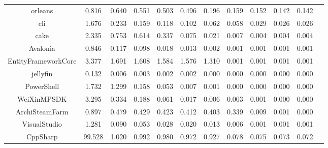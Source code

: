 \begin{table}[!h]
{\begin{tabular}{|c|cccccccccc|c|}
orleans	&	0.816	&	0.640	&	0.551	&	0.503	&	0.496	&	0.196	&	0.159	&	0.152	&	0.142	&	0.142	\\
cli	&	1.676	&	0.233	&	0.159	&	0.118	&	0.102	&	0.062	&	0.058	&	0.029	&	0.026	&	0.026	\\
cake	&	2.335	&	0.753	&	0.614	&	0.337	&	0.075	&	0.021	&	0.007	&	0.004	&	0.004	&	0.004	\\
Avalonia	&	0.846	&	0.117	&	0.098	&	0.018	&	0.013	&	0.002	&	0.001	&	0.001	&	0.001	&	0.001	\\
EntityFrameworkCore	&	3.377	&	1.691	&	1.608	&	1.584	&	1.576	&	1.310	&	0.001	&	0.001	&	0.001	&	0.001	\\
jellyfin	&	0.132	&	0.006	&	0.003	&	0.002	&	0.002	&	0.000	&	0.000	&	0.000	&	0.000	&	0.000	\\
PowerShell	&	1.732	&	1.299	&	0.158	&	0.053	&	0.007	&	0.001	&	0.000	&	0.000	&	0.000	&	0.000	\\
WeiXinMPSDK	&	3.295	&	0.334	&	0.188	&	0.061	&	0.017	&	0.006	&	0.003	&	0.001	&	0.000	&	0.000	\\
ArchiSteamFarm	&	0.897	&	0.479	&	0.429	&	0.423	&	0.412	&	0.403	&	0.339	&	0.009	&	0.001	&	0.000	\\
VisualStudio	&	1.281	&	0.090	&	0.053	&	0.028	&	0.020	&	0.013	&	0.006	&	0.001	&	0.001	&	0.001	\\
CppSharp	&	99.528	&	1.020	&	0.992	&	0.980	&	0.972	&	0.927	&	0.078	&	0.075	&	0.073	&	0.072	\\

\hline
\end{tabular}
}
\end{table}


